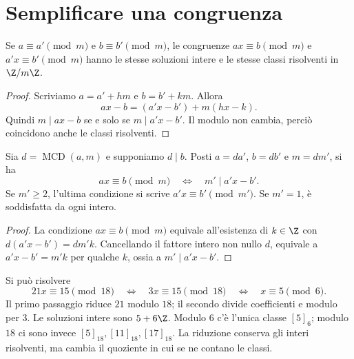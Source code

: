 \begin{schema}
\end{schema}

\section{Semplificare una congruenza}
\begin{proposizione}
Se $a\equiv a'\pmod m$ e $b\equiv b'\pmod m$, le congruenze $ax\equiv b\pmod m$ e $a'x\equiv b'\pmod m$ hanno le stesse soluzioni intere e le stesse classi risolventi in $\Z/m\Z$.
\end{proposizione}
\begin{proof}
Scriviamo $a=a'+hm$ e $b=b'+km$. Allora
\[
ax-b=(a'x-b')+m(hx-k).
\]
Quindi $m\mid ax-b$ se e solo se $m\mid a'x-b'$. Il modulo non cambia, perciò coincidono anche le classi risolventi.
\end{proof}

\begin{proposizione}\label{prop:riduzione-modulo}
Sia $d=\operatorname{MCD}(a,m)$ e supponiamo $d\mid b$. Posti $a=da'$, $b=db'$ e $m=dm'$, si ha
\[
ax\equiv b\pmod m\quad\Longleftrightarrow\quad
m'\mid a'x-b'.
\]
Se $m'\ge2$, l'ultima condizione si scrive $a'x\equiv b'\pmod{m'}$. Se $m'=1$, è soddisfatta da ogni intero.
\end{proposizione}
\begin{proof}
La condizione $ax\equiv b\pmod m$ equivale all'esistenza di $k\in\Z$ con $d(a'x-b')=dm'k$. Cancellando il fattore intero non nullo $d$, equivale a $a'x-b'=m'k$ per qualche $k$, ossia a $m'\mid a'x-b'$.
\end{proof}

\begin{esempio}
Si può risolvere
\[
21x\equiv15\pmod{18}\quad\Longleftrightarrow\quad
3x\equiv15\pmod{18}\quad\Longleftrightarrow\quad
x\equiv5\pmod6.
\]
Il primo passaggio riduce $21$ modulo $18$; il secondo divide coefficienti e modulo per $3$. Le soluzioni intere sono $5+6\Z$. Modulo $6$ c'è l'unica classe $[5]_6$; modulo $18$ ci sono invece $[5]_{18},[11]_{18},[17]_{18}$. La riduzione conserva gli interi risolventi, ma cambia il quoziente in cui se ne contano le classi.
\end{esempio}


